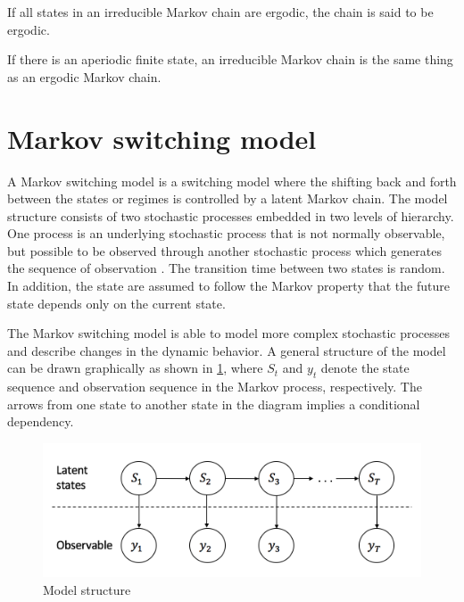 \begin{thm*}
If all states in an irreducible Markov chain are ergodic, the chain
is said to be ergodic.
\end{thm*}

\begin{thm*}
\citep{manning2008introduction} If there is an aperiodic finite state,
an irreducible Markov chain is the same thing as an ergodic Markov
chain. 
\end{thm*}

\section{Markov switching model}

A Markov switching model is a switching model where the shifting back
and forth between the states or regimes is controlled by a latent
Markov chain. The model structure consists of two stochastic processes
embedded in two levels of hierarchy. One process is an underlying
stochastic process that is not normally observable, but possible to
be observed through another stochastic process which generates the
sequence of observation \citep{rabiner1986introduction}. The transition
time between two states is random. In addition, the state are assumed
to follow the Markov property that the future state depends only on
the current state. 

The Markov switching model is able to model more complex stochastic
processes and describe changes in the dynamic behavior. A general
structure of the model can be drawn graphically as shown in \ref{msm},
where $S_{t}$ and $y_{t}$ denote the state sequence and observation
sequence in the Markov process, respectively. The arrows from one
state to another state in the diagram implies a conditional dependency. 

\begin{figure}[H]
\begin{centering}
\includegraphics[scale=0.6]{picture/msm1}
\par\end{centering}
\caption{Model structure}
\label{msm}
\end{figure}

